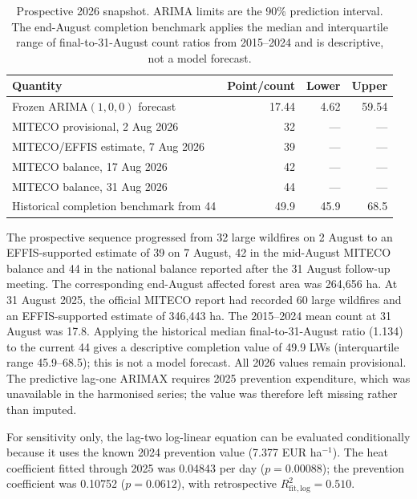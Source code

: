 \documentclass[10pt,a4paper]{article}
\begin{document}
\begin{table}[H]\centering\small
\begin{tabular}{lrrr}
\toprule
Quantity & Point/count & Lower & Upper \\
\midrule
Frozen ARIMA$(1,0,0)$ forecast & 17.44 & 4.62 & 59.54 \\
MITECO provisional, 2 Aug 2026 & 32 & --- & --- \\
MITECO/EFFIS estimate, 7 Aug 2026 & 39 & --- & --- \\
MITECO balance, 17 Aug 2026 & 42 & --- & --- \\
MITECO balance, 31 Aug 2026 & 44 & --- & --- \\
Historical completion benchmark from 44 & 49.9 & 45.9 & 68.5 \\
\bottomrule
\end{tabular}
\caption{Prospective 2026 snapshot. ARIMA limits are the 90\% prediction interval. The end-August completion benchmark applies the median and interquartile range of final-to-31-August count ratios from 2015--2024 and is descriptive, not a model forecast.}
\end{table}

The prospective sequence progressed from 32 large wildfires on 2 August to an EFFIS-supported estimate of 39 on 7 August, 42 in the mid-August MITECO balance and 44 in the national balance reported after the 31 August follow-up meeting. The corresponding end-August affected forest area was 264,656 ha. At 31 August 2025, the official MITECO report had recorded 60 large wildfires and an EFFIS-supported estimate of 346,443 ha. The 2015--2024 mean count at 31 August was 17.8. Applying the historical median final-to-31-August ratio (1.134) to the current 44 gives a descriptive completion value of 49.9 LWs (interquartile range 45.9--68.5); this is not a model forecast. All 2026 values remain provisional. The predictive lag-one ARIMAX requires 2025 prevention expenditure, which was unavailable in the harmonised series; the value was therefore left missing rather than imputed.

For sensitivity only, the lag-two log-linear equation can be evaluated conditionally because it uses the known 2024 prevention value (7.377 EUR ha$^{-1}$). The heat coefficient fitted through 2025 was 0.04843 per day ($p=0.00088$); the prevention coefficient was 0.10752 ($p=0.0612$), with retrospective $R^2_{\mathrm{fit,log}}=0.510$.
\end{document}
